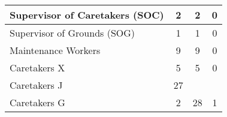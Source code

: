 \begin{tabular}{l|c|c|c|}
        \multicolumn{1}{|l|}{\cellcolor{ccfuschialight}Supervisor of Caretakers (SOC)} & 2                                                      & 2                                                                & 0                                                      \\ \hline
        \multicolumn{1}{|l|}{\cellcolor{ccfuschialight}Supervisor of Grounds (SOG)}    & 1                                                      & 1                                                                & 0                                                      \\ \hline
        \multicolumn{1}{|l|}{\cellcolor{ccfuschialight}Maintenance Workers}            & 9                                                      & 9                                                                & 0                                                       \\ \hline
        \multicolumn{1}{|l|}{\cellcolor{ccfuschialight}Caretakers X}                   & 5                                                      & 5                                                                & 0                                                      \\ \hline
        \multicolumn{1}{|l|}{\cellcolor{ccfuschialight}Caretakers J\tnote{1}}                   & 27                                                      &                                                                 &                                                         \\ \cline{1-2}
        \multicolumn{1}{|l|}{\cellcolor{ccfuschialight}Caretakers G}                   & 2                                                      & \multirow{-2}{*}{28}                                     & \multirow{-2}{*}{1}                           \\ \hline
        \end{tabular}
        
        
